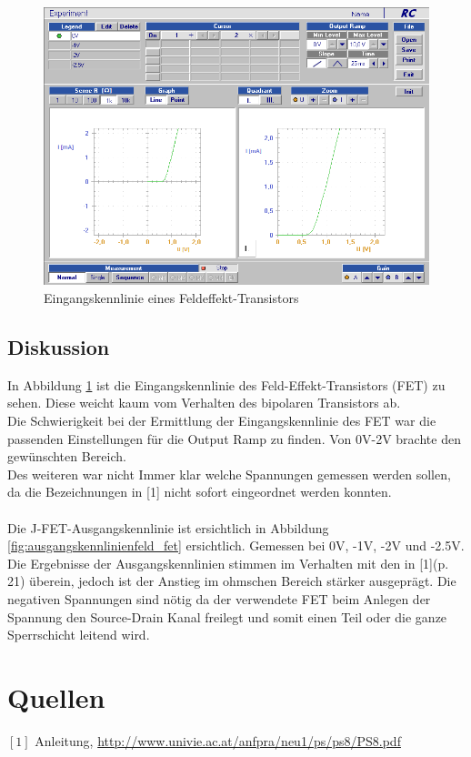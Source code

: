 \documentclass[12pt,a4paper]{article}
\begin{document}
\begin{multicols}{2}
\begin{figure}[H]
	\centering
	\includegraphics[scale=0.45]{./data/Braun_Kurz_PS8/FET_Eingangskennlinie.png}
	\caption{Eingangskennlinie eines Feldeffekt-Transistors}
	\label{fig:eingangskennlinien_fet}
\end{figure}

\subsection{Diskussion}
In Abbildung \ref{fig:eingangskennlinien_fet} ist die Eingangskennlinie des Feld-Effekt-Transistors (FET) zu sehen.
Diese weicht kaum vom Verhalten des bipolaren Transistors ab.\\
Die Schwierigkeit bei der Ermittlung der Eingangskennlinie des FET war die passenden Einstellungen für die Output Ramp zu finden. Von 0V-2V brachte den gewünschten Bereich.\\ 
Des weiteren war nicht Immer klar welche Spannungen gemessen werden sollen, da die Bezeichnungen in [1] nicht sofort eingeordnet werden konnten.\\
\\
Die J-FET-Ausgangskennlinie ist ersichtlich in Abbildung \ref{fig:ausgangskennlinienfeld_fet} ersichtlich. Gemessen bei 0V, -1V, -2V und -2.5V.\\
Die Ergebnisse der Ausgangskennlinien stimmen im Verhalten mit den in [1](p. 21) überein, jedoch ist der Anstieg im ohmschen Bereich stärker ausgeprägt. Die negativen Spannungen sind nötig da der verwendete FET beim Anlegen der Spannung den Source-Drain Kanal freilegt und somit einen Teil oder die ganze Sperrschicht leitend wird.


\section{Quellen}
$[1]$ Anleitung, \url{http://www.univie.ac.at/anfpra/neu1/ps/ps8/PS8.pdf}\\

\end{multicols}
\end{document}
